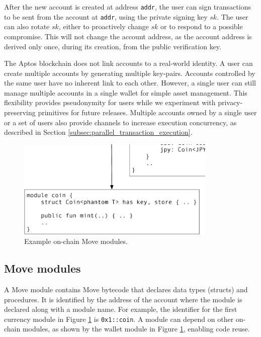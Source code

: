 \documentclass{article}
\begin{document}
After the new account is created at address \texttt{addr}, the user can sign transactions to be sent from the account at \texttt{addr}, using the private signing key $sk$. The user can also rotate $sk$, either to proactively change $sk$ or to respond to a possible compromise. This will not change the account address, as the account address is derived only once, during its creation, from the public verification key. 

The Aptos blockchain does not link accounts to a real-world identity. A user can create multiple accounts by generating multiple key-pairs. Accounts controlled by the same user have no inherent link to each other. However, a single user can still manage multiple accounts in a single wallet for simple asset management. This flexibility provides pseudonymity for users while we experiment with privacy-preserving primitives for future releases. Multiple accounts owned by a single user or a set of users also provide channels to increase execution concurrency, as described in Section \ref{subsec:parallel_transaction_execution}.

\begin{figure}
\centering
\includegraphics[width=0.85\textwidth]{move_1.eps}
\caption{\label{fig:move_modules}Example on-chain Move modules.}
\end{figure}

\subsection{Move modules}

A Move module contains Move bytecode that declares data types (structs) and procedures. It is identified by the address of the account where the module is declared along with a module name. For example, the identifier for the first currency module in Figure \ref{fig:move_modules} is \texttt{0x1::coin}. A module can depend on other on-chain modules, as shown by the wallet module in Figure \ref{fig:move_modules}, enabling code reuse.
\end{document}

